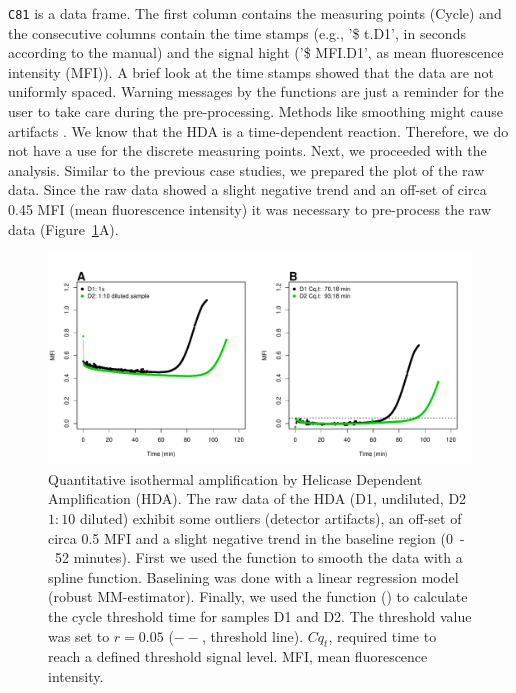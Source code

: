 
\texttt{C81} is a data frame. The first column contains the measuring points 
(Cycle) and the consecutive columns contain the time stamps (e.g., '\$ t.D1', 
in seconds according to the  manual) and the signal hight ('\$ 
MFI.D1', as mean fluorescence intensity (MFI)). A brief look at the time stamps 
showed that the data are not uniformly spaced. Warning messages by the 
 functions are just a reminder for the user to take care during the pre-processing. 
Methods like smoothing might cause artifacts \citep{Spiess_2014}. We know 
that the HDA is a time-dependent reaction. Therefore, we do not have a use for the discrete 
measuring points. Next, we proceeded with the analysis. Similar to the previous 
case studies, we prepared the plot of the raw data. Since the raw data showed a 
slight negative trend and an off-set of circa 0.45 MFI (mean fluorescence 
intensity) it was necessary to pre-process the raw data 
(Figure~\ref{figure:qIA}A).

\begin{figure}[htbp]
  \centering
  \includegraphics[clip=true, trim=0.15cm 0.55cm 1cm 1.3cm, width=12cm]{figures/qIA.pdf}
  \caption{Quantitative isothermal amplification by Helicase Dependent 
Amplification (HDA).  The raw data of the HDA (D1, undiluted, D2 
$1:10$ diluted) exhibit some outliers (detector artifacts), an off-set of circa 
0.5 MFI and a slight negative trend in the 
baseline region (0~-~52 minutes).  First we used the  
function to smooth the data with a spline function. Baselining was done with a 
linear regression model (robust MM-estimator). Finally, we used the 
 function () to calculate the cycle threshold time 
for samples D1 and D2. The threshold value was set to $r = 0.05$ ($--$, 
threshold line). $Cq_{t}$, required time to reach a defined threshold signal 
level. MFI, mean fluorescence intensity.}
  \label{figure:qIA}
\end{figure}

